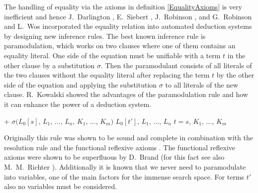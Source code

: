 The handling of equality via the axioms in definition \ref{EqualityAxioms} is 
very inefficient and hence
J.\ Darlington \cite{Darlington68}, E.\ Siebert \cite{Sibert69}, J.\ Robinson 
\cite{Robinson65a}, and G.\ Robinson and L.\ Wos \cite{RoWo69} incorporated 
the equality relation into automated deduction
systems by designing new inference rules.
The best known inference rule is paramo\-du\-la\-tion, which works on 
two clauses where one of them contains an 
equality literal. One side of the equation
must be unifiable with a term $t$ in the other
clause by a substitution $\sigma$. Then the
paramodulant consists of all literals of the two
clauses without the equality literal after
replacing the term $t$
by the other side of the equation and applying
the substitution $\sigma$ to all literals of the
new clause.
R.\ Kowalski showed \cite{Kowalski75} the advantages of
the paramodulation rule and how it can enhance the power of 
a deduction system.

\begin{Def}[Paramodulation]
\return\vspace{-3mm}
\label{DefinitionParamodulation}

\hlineblocktwo%
{+}%
{$\sigma(L_0[s]$, $L_1$, $\dots$, $L_n$, $K_1$,
$\dots$, $K_m)$}%
{$L_0[t']$, $L_1$, $\dots$, $L_n$}%
{$t = s$, $K_1$, $\dots$, $K_m$}

\end{Def}


Originally this rule was shown to be sound and complete in combination with 
the resolution rule and the 
functional reflexive axioms \cite{RoWo69}. The functional 
reflexive axioms were shown to be superfluous by D.\ Brand \cite{Brand75}
(for this fact see also M.\ M.\ Richter \cite{Richter75}). 
Additionally it is 
known that we never need to paramodulate into variables, one of
the main factors for the immense search space.
For terms $t'$ also no variables must be considered.

